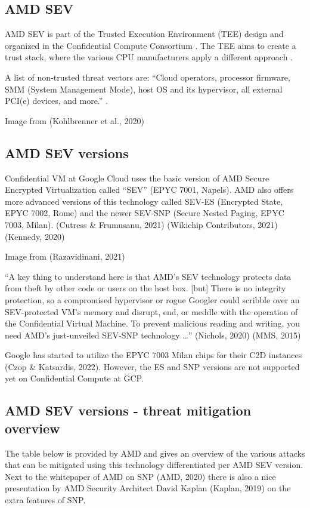\subsection*{AMD SEV}
AMD SEV is part of the Trusted Execution Environment (TEE) design 
and organized in the Confidential Compute Consortium 
\citep{foundation_members_2020}. 
The TEE aims to create a trust stack, 
where the various CPU manufacturers apply a different approach 
\citep{eckert_kick-off_2020,kohlbrenner_building_2020}. 

A list of non-trusted threat vectors are: 
“Cloud operators, processor firmware, SMM (System Management Mode), 
host OS and its hypervisor, all external PCI(e) devices, and more.” 
\citep{chamarthy_challenges_2020}.


Image from (Kohlbrenner et al., 2020) 


\subsection*{AMD SEV versions}
Confidential VM at Google Cloud uses the basic version of AMD Secure Encrypted Virtualization called “SEV” (EPYC 7001, Napels). AMD also offers more advanced versions of this technology called 
SEV-ES (Encrypted State, EPYC 7002, Rome) and the newer 
SEV-SNP (Secure Nested Paging, EPYC 7003, Milan). 
(Cutress \& Frumusanu, 2021) (Wikichip Contributors, 2021) (Kennedy, 2020)


Image from (Razavidinani, 2021)

“A key thing to understand here is that AMD's SEV technology 
protects data from theft by other code or users on the host box. [but]
There is no integrity protection, so a compromised hypervisor or rogue Googler could scribble over an SEV-protected VM's memory and disrupt, end, or meddle with the operation of the Confidential Virtual Machine. To prevent malicious reading and writing, you need AMD's just-unveiled SEV-SNP technology …” (Nichols, 2020) (MMS, 2015)

Google has started to utilize the EPYC 7003 Milan chips for their C2D instances (Czop \& Katsardis, 2022). However, the ES and SNP versions are not supported yet on Confidential Compute at GCP. 


\subsection*{AMD SEV versions - threat mitigation overview}
The table below is provided by AMD and gives an overview of the various attacks that can be mitigated using this technology differentiated per AMD SEV version. Next to the whitepaper of AMD on SNP (AMD, 2020) there is also a nice presentation by AMD Security Architect David Kaplan (Kaplan, 2019) on the extra features of SNP. 

